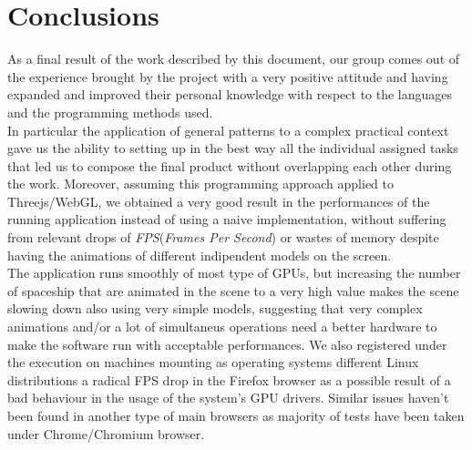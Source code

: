 \section{Conclusions}
As a final result of the work described by this document, our group comes out of the experience brought by the project with a very positive attitude and having expanded and improved their personal knowledge with respect to the languages and the programming methods used.\\
In particular the application of general patterns to a complex practical context gave us the ability to setting up in the best way all the individual assigned tasks that led us to compose the final product without overlapping each other during the work. Moreover, assuming this programming approach applied to Threejs/WebGL, we obtained a very good result in the performances of the running application instead of using a naive implementation, without suffering from relevant drops of \textit{FPS}(\textit{Frames Per Second}) or wastes of memory despite having the animations of different indipendent models on the screen.\\
The application runs smoothly of most type of GPUs, but increasing the number of spaceship that are animated in the scene to a very high value makes the scene slowing down also using very simple models, suggesting that very complex animations and/or a lot of simultaneus operations need a better hardware to make the software run with acceptable performances. We also registered under the execution on machines mounting as operating systems different Linux distributions a radical FPS drop in the Firefox browser as a possible result of a bad behaviour in the usage of the system's GPU drivers. Similar issues haven't been found in another type of main browsers as majority of tests have been taken under Chrome/Chromium browser.